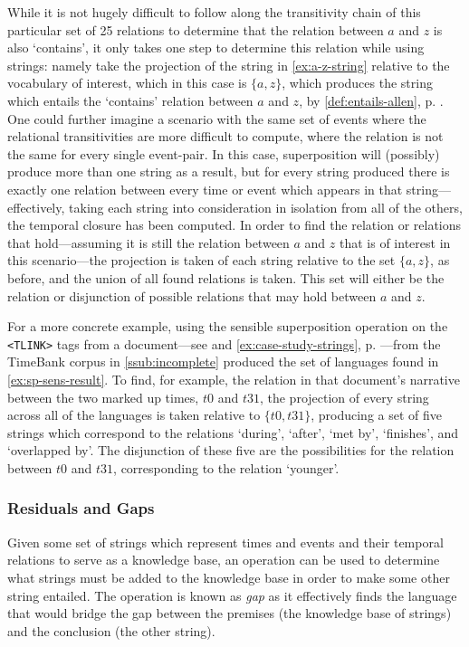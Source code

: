 \documentclass[a4paper,12pt,leqno]{article}
\newcommand{\vph}[1]{\vphantom{#1}}
\newcommand{\ebox}[1]{\fbox{$\vph{'(),}#1$}}
\newcommand{\EventString}[1]{%
	\renewcommand*{\do}[1]{\ebox{##1}}%
	\PipeParser{#1}%
}
\begin{document}
While it is not hugely difficult to follow along the transitivity chain of this particular set of 25 relations to determine that the relation between $a$ and $z$ is also `contains', it only takes one step to determine this relation while using strings: namely take the projection of the string in \cref{ex:a-z-string} relative to the vocabulary of interest, which in this case is $\{a,z\}$, which produces the string \EventString{{}|a|a,z|a|{}} which entails the `contains' relation between $a$ and $z$, by \cref{def:entails-allen}, p. \pageref{def:entails-allen}. One could further imagine a scenario with the same set of events where the relational transitivities are more difficult to compute, where the relation is not the same for every single event-pair. In this case, superposition will (possibly) produce more than one string as a result, but for every string produced there is exactly one relation between every time or event which appears in that string---effectively, taking each string into consideration in isolation from all of the others, the temporal closure has been computed. In order to find the relation or relations that hold---assuming it is still the relation between $a$ and $z$ that is of interest in this scenario---the projection is taken of each string relative to the set $\{a,z\}$, as before, and the union of all found relations is taken. This set will either be the relation or disjunction of possible relations that may hold between $a$ and $z$.

For a more concrete example, using the sensible superposition operation on the \allowbreak{}\verb|<TLINK>| tags from a document---see  and \cref{ex:case-study-strings}, p. \pageref{ex:case-study-strings}---from the TimeBank corpus in \cref{ssub:incomplete} produced the set of languages found in \cref{ex:sp-sens-result}. To find, for example, the relation in that document's narrative between the two marked up times, $t0$ and $t31$, the projection of every string across all of the languages is taken relative to $\{t0, t31\}$, producing a set of five strings which correspond to the relations `during', `after', `met by', `finishes', and `overlapped by'. The disjunction of these five are the possibilities for the relation between $t0$ and $t31$, corresponding to the \citet{Freksa1992} relation `younger'.

\subsubsection{Residuals and Gaps}\label{ssub:residuals}
Given some set of strings which represent times and events and their temporal relations to serve as a knowledge base, an operation can be used to determine what strings must be added to the knowledge base in order to make some other string entailed. The operation is known as \textit{gap} as it effectively finds the language that would bridge the gap between the premises (the knowledge base of strings) and the conclusion (the other string).
\end{document}
